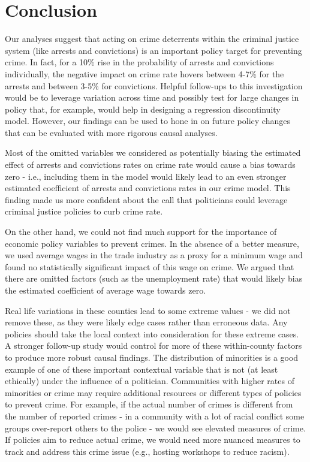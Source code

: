 \documentclass[]{article}
\begin{document}
\hypertarget{conclusion-3}{%
\section{Conclusion}\label{conclusion-3}}

Our analyses suggest that acting on crime deterrents within the criminal
justice system (like arrests and convictions) is an important policy
target for preventing crime. In fact, for a 10\% rise in the probability
of arrests and convictions individually, the negative impact on crime
rate hovers between 4-7\% for the arrests and between 3-5\% for
convictions. Helpful follow-ups to this investigation would be to
leverage variation across time and possibly test for large changes in
policy that, for example, would help in designing a regression
discontinuity model. However, our findings can be used to hone in on
future policy changes that can be evaluated with more rigorous causal
analyses.

Most of the omitted variables we considered as potentially biasing the
estimated effect of arrests and convictions rates on crime rate would
cause a bias towards zero - i.e., including them in the model would
likely lead to an even stronger estimated coefficient of arrests and
convictions rates in our crime model. This finding made us more
confident about the call that politicians could leverage criminal
justice policies to curb crime rate.

On the other hand, we could not find much support for the importance of
economic policy variables to prevent crimes. In the absence of a better
measure, we used average wages in the trade industry as a proxy for a
minimum wage and found no statistically significant impact of this wage
on crime. We argued that there are omitted factors (such as the
unemployment rate) that would likely bias the estimated coefficient of
average wage towards zero.

Real life variations in these counties lead to some extreme values - we
did not remove these, as they were likely edge cases rather than
erroneous data. Any policies should take the local context into
consideration for these extreme cases. A stronger follow-up study would
control for more of these within-county factors to produce more robust
causal findings. The distribution of minorities is a good example of one
of these important contextual variable that is not (at least ethically)
under the influence of a politician. Communities with higher rates of
minorities or crime may require additional resources or different types
of policies to prevent crime. For example, if the actual number of
crimes is different from the number of reported crimes - in a community
with a lot of racial conflict some groups over-report others to the
police - we would see elevated measures of crime. If policies aim to
reduce actual crime, we would need more nuanced measures to track and
address this crime issue (e.g., hosting workshops to reduce racism).
\end{document}
